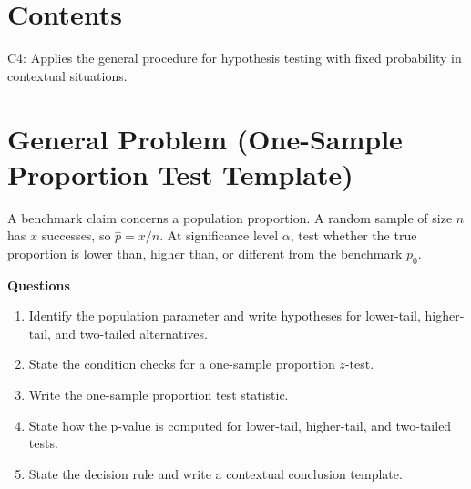 
\section*{Contents}
\setcounter{tocdepth}{2}
\setcounter{secnumdepth}{1}
\tableofcontents

\begin{ExamCriteria}
    \item C4: Applies the general procedure for hypothesis testing with fixed probability in contextual situations.
\end{ExamCriteria}

\section{General Problem (One-Sample Proportion Test Template)}
A benchmark claim concerns a population proportion. A random sample of size \(n\) has \(x\) successes, so \(\hat p=x/n\). At significance level \(\alpha\), test whether the true proportion is lower than, higher than, or different from the benchmark \(p_0\).

\textbf{Questions}
\begin{enumerate}
    \item[(a)] Identify the population parameter and write hypotheses for lower-tail, higher-tail, and two-tailed alternatives.
    \item[(b)] State the condition checks for a one-sample proportion \(z\)-test.
    \item[(c)] Write the one-sample proportion test statistic.
    \item[(d)] State how the p-value is computed for lower-tail, higher-tail, and two-tailed tests.
    \item[(e)] State the decision rule and write a contextual conclusion template.
\end{enumerate}

